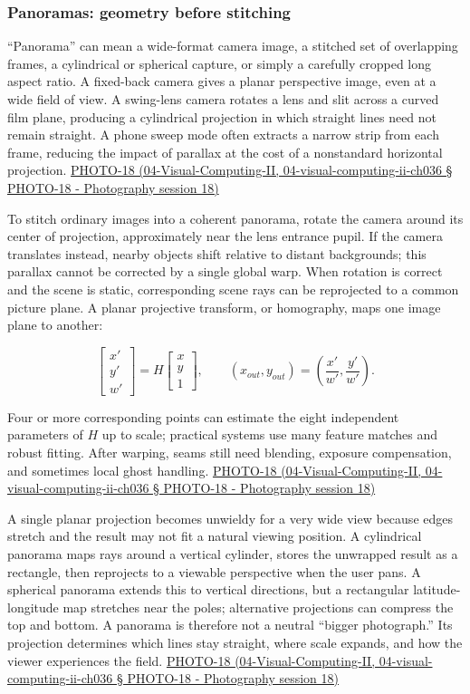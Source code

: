 \subsubsection{Panoramas: geometry before stitching}\label{panoramas-geometry-before-stitching}

``Panorama'' can mean a wide-format camera image, a stitched set of overlapping frames, a cylindrical or spherical capture, or simply a carefully cropped long aspect ratio. A fixed-back camera gives a planar perspective image, even at a wide field of view. A swing-lens camera rotates a lens and slit across a curved film plane, producing a cylindrical projection in which straight lines need not remain straight. A phone sweep mode often extracts a narrow strip from each frame, reducing the impact of parallax at the cost of a nonstandard horizontal projection. \href{}{PHOTO-18 (04-Visual-Computing-II, 04-visual-computing-ii-ch036 § PHOTO-18 - Photography session 18)}

To stitch ordinary images into a coherent panorama, rotate the camera around its center of projection, approximately near the lens entrance pupil. If the camera translates instead, nearby objects shift relative to distant backgrounds; this parallax cannot be corrected by a single global warp. When rotation is correct and the scene is static, corresponding scene rays can be reprojected to a common picture plane. A planar projective transform, or homography, maps one image plane to another:

\[
\begin{bmatrix}x'\\y'\\w'\end{bmatrix}
=H\begin{bmatrix}x\\y\\1\end{bmatrix},\qquad
(x_{out},y_{out})=\left(\frac{x'}{w'},\frac{y'}{w'}\right).
\]

Four or more corresponding points can estimate the eight independent parameters of \(H\) up to scale; practical systems use many feature matches and robust fitting. After warping, seams still need blending, exposure compensation, and sometimes local ghost handling. \href{}{PHOTO-18 (04-Visual-Computing-II, 04-visual-computing-ii-ch036 § PHOTO-18 - Photography session 18)}

A single planar projection becomes unwieldy for a very wide view because edges stretch and the result may not fit a natural viewing position. A cylindrical panorama maps rays around a vertical cylinder, stores the unwrapped result as a rectangle, then reprojects to a viewable perspective when the user pans. A spherical panorama extends this to vertical directions, but a rectangular latitude-longitude map stretches near the poles; alternative projections can compress the top and bottom. A panorama is therefore not a neutral ``bigger photograph.'' Its projection determines which lines stay straight, where scale expands, and how the viewer experiences the field. \href{}{PHOTO-18 (04-Visual-Computing-II, 04-visual-computing-ii-ch036 § PHOTO-18 - Photography session 18)}


